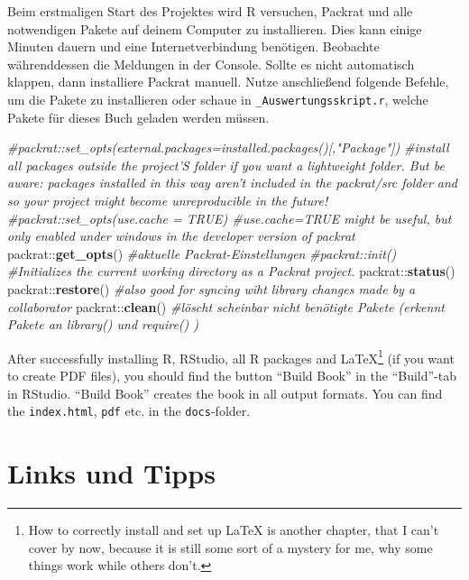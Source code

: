 \documentclass[]{book}
\makeatletter
\newenvironment{Shaded}{\begin{snugshade}}{\end{snugshade}}
\newcommand{\KeywordTok}[1]{\textcolor[rgb]{0.13,0.29,0.53}{\textbf{{#1}}}}
\newcommand{\CommentTok}[1]{\textcolor[rgb]{0.56,0.35,0.01}{\textit{{#1}}}}
\newcommand{\NormalTok}[1]{{#1}}
\let\rmarkdownfootnote\footnote%
\def\footnote{\protect\rmarkdownfootnote}
\newenvironment{kframe}{%
\medskip{}
\setlength{\fboxsep}{.8em}
 \def\at@end@of@kframe{}%
 \ifinner\ifhmode%
  \def\at@end@of@kframe{\end{minipage}}%
  \begin{minipage}{\columnwidth}%
 \fi\fi%
 \def\FrameCommand##1{\hskip\@totalleftmargin \hskip-\fboxsep
 \colorbox{shadecolor}{##1}\hskip-\fboxsep
     \hskip-\linewidth \hskip-\@totalleftmargin \hskip\columnwidth}%
 \MakeFramed {\advance\hsize-\width
   \@totalleftmargin\z@ \linewidth\hsize
   \@setminipage}}%
 {\par\unskip\endMakeFramed%
 \at@end@of@kframe}
\renewenvironment{Shaded}{\begin{kframe}}{\end{kframe}}
\theoremstyle{definition}
\theoremstyle{definition}
\theoremstyle{remark}
\let\BeginKnitrBlock\begin \let\EndKnitrBlock\end
\makeatother
\begin{document}
\BeginKnitrBlock{rmdcaution}
Beim erstmaligen Start des Projektes wird R versuchen, Packrat und alle
notwendigen Pakete auf deinem Computer zu installieren. Dies kann einige
Minuten dauern und eine Internetverbindung benötigen. Beobachte
währenddessen die Meldungen in der Console. Sollte es nicht automatisch
klappen, dann installiere Packrat manuell. Nutze anschließend folgende
Befehle, um die Pakete zu installieren oder schaue in
\texttt{\_Auswertungsskript.r}, welche Pakete für dieses Buch geladen
werden müssen.
\EndKnitrBlock{rmdcaution}

\begin{Shaded}
\begin{Highlighting}[]
\CommentTok{#packrat::set_opts(external.packages=installed.packages()[,"Package"])  #install all packages outside the project'S folder if you want a lightweight folder. But be aware: packages installed in this way aren't included in the packrat/src folder and so your project might become unreproducible in the future!}
\CommentTok{#packrat::set_opts(use.cache = TRUE)  #use.cache=TRUE might be useful, but only enabled under windows in the developer version of packrat}
\NormalTok{packrat::}\KeywordTok{get_opts}\NormalTok{()  }\CommentTok{#aktuelle Packrat-Einstellungen}
\CommentTok{#packrat::init()  #Initializes the current working directory as a Packrat project.}
\NormalTok{packrat::}\KeywordTok{status}\NormalTok{()}
\NormalTok{packrat::}\KeywordTok{restore}\NormalTok{()  }\CommentTok{#also good for syncing wiht library changes made by a collaborator}
\NormalTok{packrat::}\KeywordTok{clean}\NormalTok{()  }\CommentTok{#löscht scheinbar nicht benötigte Pakete (erkennt Pakete an library() und require() )}
\end{Highlighting}
\end{Shaded}

After successfully installing R, RStudio, all R packages and
LaTeX\footnote{How to correctly install and set up LaTeX is another
  chapter, that I can't cover by now, because it is still some sort of a
  mystery for me, why some things work while others don't.} (if you want
to create PDF files), you should find the button ``Build Book'' in the
``Build''-tab in RStudio. ``Build Book'' creates the book in all output
formats. You can find the \texttt{index.html}, \texttt{pdf} etc. in the
\texttt{docs}-folder.

\hypertarget{links-und-tipps}{\section*{Links und
Tipps}\label{links-und-tipps}}
\end{document}
